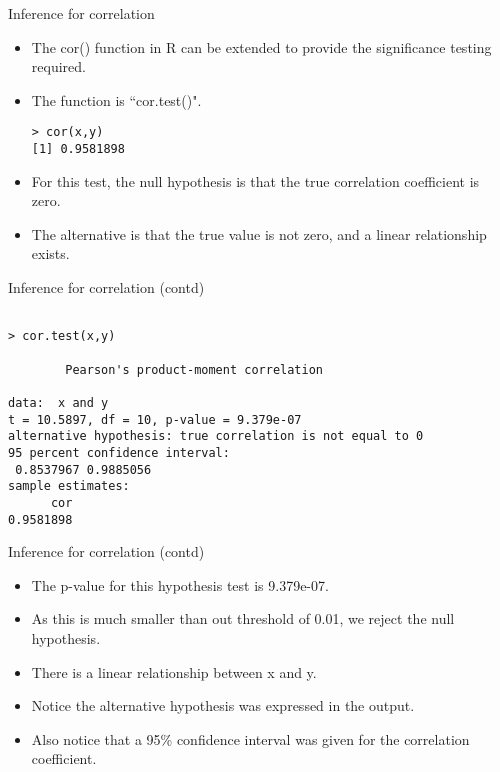 \documentclass[pdf,default,slideColor,colorBG]{prosper}
\begin{document}
\begin{slide}{Inference for correlation}
\begin{itemize}

\item The cor() function in R can be extended to provide the significance testing required. 
\item The function is ``cor.test()".
\begin{verbatim}
> cor(x,y)
[1] 0.9581898

\end{verbatim}
\item For this test, the null hypothesis is that the true correlation coefficient is zero.
\item The alternative is that the true value is not zero, and a linear relationship exists.
\end{itemize}
\end{slide}


\begin{slide}{Inference for correlation (contd)}
\begin{verbatim}

> cor.test(x,y)

        Pearson's product-moment correlation

data:  x and y
t = 10.5897, df = 10, p-value = 9.379e-07
alternative hypothesis: true correlation is not equal to 0
95 percent confidence interval:
 0.8537967 0.9885056
sample estimates:
      cor
0.9581898 

\end{verbatim}
\end{slide}

\begin{slide}{Inference for correlation (contd)}
\begin{itemize}
\item The p-value for this hypothesis test is 9.379e-07.
\item As this is much smaller than out threshold of 0.01, we reject the null hypothesis.
\item There is a linear relationship between x and y.
\item Notice the alternative hypothesis was expressed in the output.
\item Also notice that a 95\% confidence interval was given for the correlation coefficient.
\end{itemize}
\end{slide}
\end{document}
